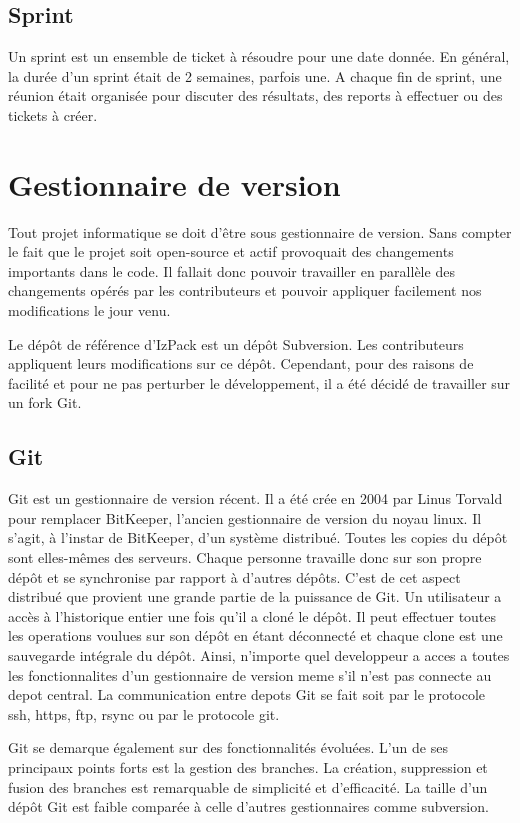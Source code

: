 \subsection{Sprint}
Un sprint est un ensemble de ticket à résoudre pour une date donnée. En général, la durée d'un sprint était de 2 semaines, parfois une. A chaque fin de sprint, une réunion était organisée pour discuter des résultats, des reports à effectuer ou des tickets à créer.
\section{Gestionnaire de version}
Tout projet informatique se doit d'être sous gestionnaire de version. Sans compter le fait que le projet soit open-source et actif provoquait des changements importants dans le code. Il fallait donc pouvoir travailler en parallèle des changements opérés par les contributeurs et pouvoir appliquer facilement nos modifications le jour venu.

Le dépôt de référence d'IzPack est un dépôt Subversion. Les contributeurs appliquent leurs modifications sur ce dépôt. Cependant, pour des raisons de facilité et pour ne pas perturber le développement, il a été décidé de travailler sur un fork Git.
\subsection{Git}
Git est un gestionnaire de version récent. Il a été crée en 2004 par Linus Torvald pour remplacer BitKeeper, l'ancien gestionnaire de version du noyau linux.
Il s'agit, à l'instar de BitKeeper, d'un système distribué. Toutes les copies du dépôt sont elles-mêmes des serveurs.
Chaque personne travaille donc sur son propre dépôt et se synchronise par rapport à d'autres dépôts. C'est de cet aspect distribué que provient une grande partie de la puissance de Git.
Un utilisateur a accès à l'historique entier une fois qu'il a cloné le dépôt. Il peut effectuer toutes les operations voulues sur son dépôt en étant déconnecté et chaque clone est une sauvegarde intégrale du dépôt.
Ainsi, n'importe quel developpeur a acces a toutes les fonctionnalites d'un gestionnaire de version meme s'il n'est pas connecte au depot central.
La communication entre depots Git se fait soit par le protocole ssh, https, ftp, rsync ou par le protocole git.

Git se demarque également sur des fonctionnalités évoluées. L'un de ses principaux points forts est la gestion des branches. La création, suppression et fusion des branches est remarquable de simplicité et d'efficacité.
La taille d'un dépôt Git est faible comparée à celle d'autres gestionnaires comme subversion.


